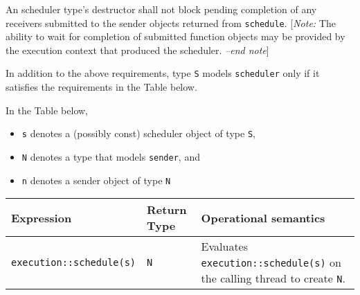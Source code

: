 \documentclass[a4paper,12pt,notitlepage,twoside,openright]{article}
\begin{document}
An scheduler type's destructor shall not block pending completion of any
receivers submitted to the sender objects returned from
\texttt{schedule}. {[}\emph{Note:} The ability to wait for
completion of submitted function objects may be provided by the
execution context that produced the scheduler. \emph{--end note}{]}

In addition to the above requirements, type \texttt{S}
models \texttt{scheduler} only if it satisfies the
requirements in the Table below.

In the Table below,

\begin{itemize}

\item
  \texttt{s} denotes a (possibly const) scheduler object of
  type \texttt{S},
\item
  \texttt{N} denotes a type that models
  \texttt{sender}, and
\item
  \texttt{n} denotes a sender object of type
  \texttt{N}
\end{itemize}

\begin{longtable}[]{@{}lll@{}}
\toprule
\begin{minipage}[b]{0.23\columnwidth}\raggedright
Expression\strut
\end{minipage} & \begin{minipage}[b]{0.25\columnwidth}\raggedright
Return Type\strut
\end{minipage} & \begin{minipage}[b]{0.43\columnwidth}\raggedright
Operational semantics\strut
\end{minipage}\tabularnewline
\midrule
\endhead
\begin{minipage}[t]{0.23\columnwidth}\raggedright
\texttt{execution::schedule(s)}\strut
\end{minipage} & \begin{minipage}[t]{0.25\columnwidth}\raggedright
\texttt{N}\strut
\end{minipage} & \begin{minipage}[t]{0.43\columnwidth}\raggedright
Evaluates \texttt{execution::schedule(s)} on the calling
thread to create \texttt{N}.\strut
\end{minipage}\tabularnewline
\bottomrule
\end{longtable}
\end{document}
